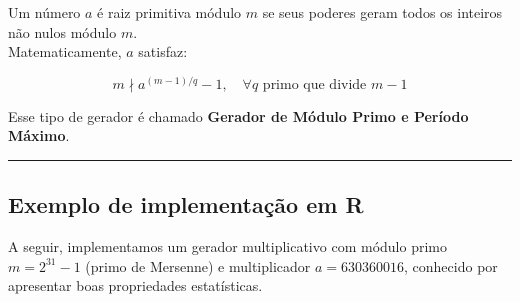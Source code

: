 \documentclass[
  letterpaper,
  DIV=11,
  numbers=noendperiod]{scrreprt}
\newenvironment{Shaded}{\begin{snugshade}}{\end{snugshade}}
\newcommand{\AttributeTok}[1]{\textcolor[rgb]{0.40,0.45,0.13}{#1}}
\newcommand{\CommentTok}[1]{\textcolor[rgb]{0.37,0.37,0.37}{#1}}
\newcommand{\ConstantTok}[1]{\textcolor[rgb]{0.56,0.35,0.01}{#1}}
\newcommand{\ControlFlowTok}[1]{\textcolor[rgb]{0.00,0.23,0.31}{#1}}
\newcommand{\DecValTok}[1]{\textcolor[rgb]{0.68,0.00,0.00}{#1}}
\newcommand{\FunctionTok}[1]{\textcolor[rgb]{0.28,0.35,0.67}{#1}}
\newcommand{\NormalTok}[1]{\textcolor[rgb]{0.00,0.23,0.31}{#1}}
\newcommand{\OtherTok}[1]{\textcolor[rgb]{0.00,0.23,0.31}{#1}}
\newcommand{\SpecialCharTok}[1]{\textcolor[rgb]{0.37,0.37,0.37}{#1}}
\newcommand{\StringTok}[1]{\textcolor[rgb]{0.13,0.47,0.30}{#1}}
\begin{document}
Um número \(a\) é raiz primitiva módulo \(m\) se seus poderes geram
todos os inteiros não nulos módulo \(m\).\\
Matematicamente, \(a\) satisfaz:

\[
m \nmid a^{(m-1)/q} - 1, \quad \forall q \text{ primo que divide } m-1
\]

Esse tipo de gerador é chamado \textbf{Gerador de Módulo Primo e Período
Máximo}.

\begin{center}\rule{0.5\linewidth}{0.5pt}\end{center}

\subsection{Exemplo de implementação em
R}\label{exemplo-de-implementauxe7uxe3o-em-r}

A seguir, implementamos um gerador multiplicativo com módulo primo
\(m = 2^{31} - 1\) (primo de Mersenne) e multiplicador
\(a = 630360016\), conhecido por apresentar boas propriedades
estatísticas.

\begin{Shaded}
\end{Shaded}
\end{document}
